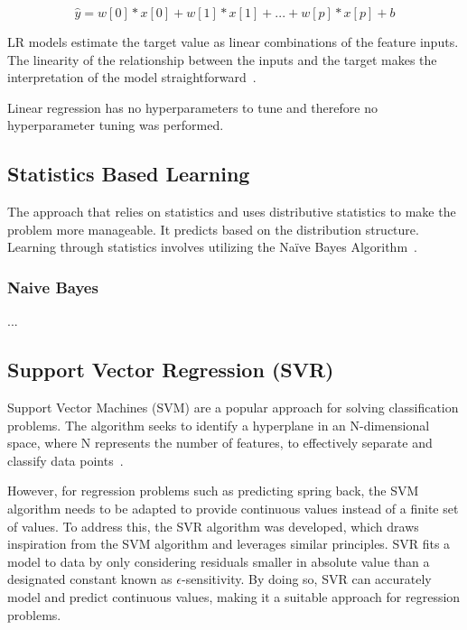 \begin{tcolorbox}[arc=0pt,boxrule=0.5pt]
    \begin{equation}
        \hat{y} = w[0] * x[0] + w[1] * x[1] + ... + w[p] * x[p] + b
        \label{eq:linear-regression}
    \end{equation}
\end{tcolorbox}

\ac{LR} models estimate the target value as linear combinations of the feature inputs.
The linearity of the relationship between the inputs and the target makes the
interpretation of the model straightforward~\cite[p. 37]{molnar2020interpretable}.

Linear regression has no hyperparameters to tune and therefore no
hyperparameter tuning was performed.

\subsection{Statistics Based Learning}\label{subsec:statistics-based-learning}

The approach that relies on statistics and uses distributive statistics to make the
problem more manageable.
It predicts based on the distribution structure. Learning through statistics involves
utilizing the Naïve Bayes Algorithm~\cite[p. 8]{dridi2021supervised}.

\subsubsection{Naive Bayes}
...

\subsection{Support Vector Regression (SVR)}\label{subsec:support-vector-regression-(svr)}
Support Vector Machines (\ac{SVM}) are a popular approach for solving classification
problems.
The algorithm seeks to identify a hyperplane in an N-dimensional space, where N
represents the number of features, to effectively separate and classify data
points~\cite[p. 42]{awad_efficientlearningmachines_2015}.

However, for regression problems such as predicting spring back, the \ac{SVM} algorithm
needs to be adapted to provide continuous values instead of a finite set of values.
To address this, the \ac{SVR} algorithm was developed, which draws inspiration from the
\ac{SVM} algorithm and leverages similar principles.
\ac{SVR} fits a model to data by only considering residuals smaller in absolute value
than a designated constant known as $\epsilon$-sensitivity.
By doing so, \ac{SVR} can accurately model and predict continuous values, making it a
suitable approach for regression problems.

